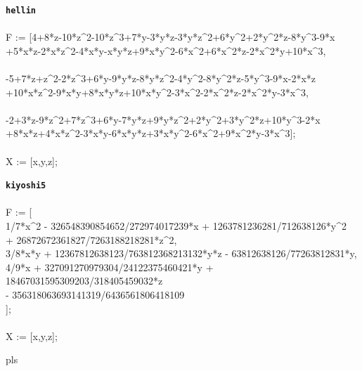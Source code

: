 \documentclass[letterpaper,12pt,titlepage,oneside,final]{book}
\newenvironment{codefont}{\ttfamily}{\par}
\begin{document}
\begin{appendices}
\noindent\textbf{\texttt{hellin}}\\\\
\noindent\begin{codefont}
  F := [4+8*z-10*z\^{}2-10*z\^{}3+7*y-3*y*z-3*y*z\^{}2+6*y\^{}2+2*y\^{}2*z-8*y\^{}3-9*x\\
     +5*x*z-2*x*z\^{}2-4*x*y-x*y*z+9*x*y\^{}2-6*x\^{}2+6*x\^{}2*z-2*x\^{}2*y+10*x\^{}3,\\
\\
     -5+7*z+z\^{}2-2*z\^{}3+6*y-9*y*z-8*y*z\^{}2-4*y\^{}2-8*y\^{}2*z-5*y\^{}3-9*x-2*x*z\\
     +10*x*z\^{}2-9*x*y+8*x*y*z+10*x*y\^{}2-3*x\^{}2-2*x\^{}2*z-2*x\^{}2*y-3*x\^{}3,\\
\\
     -2+3*z-9*z\^{}2+7*z\^{}3+6*y-7*y*z+9*y*z\^{}2+2*y\^{}2+3*y\^{}2*z+10*y\^{}3-2*x\\
     +8*x*z+4*x*z\^{}2-3*x*y-6*x*y*z+3*x*y\^{}2-6*x\^{}2+9*x\^{}2*y-3*x\^{}3];\\
\\
X := [x,y,z];\\
\end{codefont}

\noindent\textbf{\texttt{kiyoshi5}}\\\\
\noindent\begin{codefont}
  F := [ \\
  1/7*x\^{}2 - 326548390854652/272974017239*x + 1263781236281/712638126*y\^{}2\\
  + 26872672361827/7263188218281*z\^{}2,\\
  3/8*x*y + 12367812638123/763812368213132*y*z - 63812638126/77263812831*y,\\
  4/9*x + 327091270979304/24122375460421*y + 18467031595309203/318405459032*z\\
  - 356318063693141319/6436561806418109\\
  ];\\
  \\
  X := [x,y,z];\\
\end{codefont}


\doublespacing
pls

\end{appendices}






\end{document}
